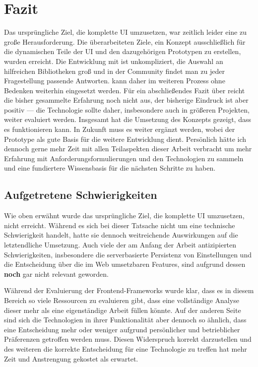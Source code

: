 \chapter{Fazit}\label{chap:conclusion}
Das ursprüngliche Ziel, die komplette UI umzusetzen, war zeitlich leider eine zu große Herausforderung. Die überarbeiteten Ziele, ein Konzept ausschließlich für die dynamischen Teile der  UI und den dazugehörigen Prototypen zu erstellen, wurden erreicht.
Die Entwicklung mit  ist unkompliziert, die Auswahl an hilfreichen Bibliotheken groß und in der Community findet man zu jeder Fragestellung passende Antworten.  kann daher im weiteren Prozess ohne Bedenken weiterhin eingesetzt werden. Für ein abschließendes Fazit über  reicht die bisher gesammelte Erfahrung noch nicht aus, der bisherige Eindruck ist aber positiv --- die Technologie sollte daher, insbesondere auch in größeren Projekten, weiter evaluiert werden.
Insgesamt hat die Umsetzung des Konzepts gezeigt, dass es funktionieren kann. In Zukunft muss es weiter ergänzt werden, wobei der Prototype als gute Basis für die weitere Entwicklung dient. Persönlich hätte ich dennoch gerne mehr Zeit mit allen Teilaspekten dieser Arbeit verbracht um mehr Erfahrung mit Anforderungsformulierungen und den Technologien zu sammeln und eine fundiertere Wissensbasis für die nächsten Schritte zu haben.

\section{Aufgetretene Schwierigkeiten}
Wie oben erwähnt wurde das ursprüngliche Ziel, die komplette UI umzusetzen, nicht erreicht. Während es sich bei dieser Tatsache nicht um eine technische Schwierigkeit handelt, hatte sie dennoch weitreichende Auswirkungen auf die letztendliche Umsetzung. Auch viele der am Anfang der Arbeit antizipierten Schwierigkeiten, insbesondere die serverbasierte Persistenz von Einstellungen und die Entscheidung über die im Web umsetzbaren Features, sind aufgrund dessen \textbf{noch} gar nicht relevant geworden.

Während der Evaluierung der Frontend-Frameworks wurde klar, dass es in diesem Bereich so viele Ressourcen zu evaluieren gibt, dass eine vollständige Analyse dieser mehr als eine eigenständige Arbeit füllen könnte. Auf der anderen Seite sind sich die Technologien in ihrer Funktionalität aber dennoch so ähnlich, dass eine Entscheidung mehr oder weniger aufgrund persönlicher und betrieblicher Präferenzen getroffen werden muss. Diesen Widerspruch korrekt darzustellen und des weiteren die korrekte Entscheidung für eine Technologie zu treffen hat mehr Zeit und Anstrengung gekostet als erwartet.

